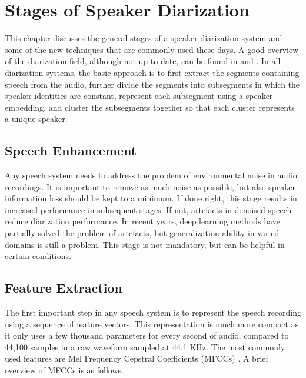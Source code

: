 \chapter{Stages of Speaker Diarization}
This chapter discusses the general stages of a speaker diarization system and some of the new techniques that are commonly used these days. A good overview of the diarization field, although not up to date, can be found in \cite{anguera2012speaker} and \cite{1677976}. In all diarization systems, the basic approach is to first extract the segments containing speech from the audio, further divide the segments into subsegments in which the speaker identities are constant, represent each subsegment using a speaker embedding, and cluster the subsegments together so that each cluster represents a unique speaker.

\section{Speech Enhancement}
Any speech system needs to address the problem of environmental noise in audio recordings. It is important to remove as much noise as possible, but also speaker information loss should be kept to a minimum. If done right, this stage results in increased performance in subsequent stages. If not, artefacts in denoised speech reduce diarization performance. In recent years, deep learning methods have partially solved the problem of artefacts, but generalization ability in varied domains is still a problem. This stage is not mandatory, but can be helpful in certain conditions.

\section{Feature Extraction}
The first important step in any speech system is to represent the speech recording using a sequence of feature vectors. This representation is much more compact as it only uses a few thousand parameters for every second of audio, compared to 44,100 samples in a raw waveform sampled at 44.1 KHz. The most commonly used features are Mel Frequency Cepstral Coefficients (MFCCs) \cite{logan2000mel}. A brief overview of MFCCs is as follows.

